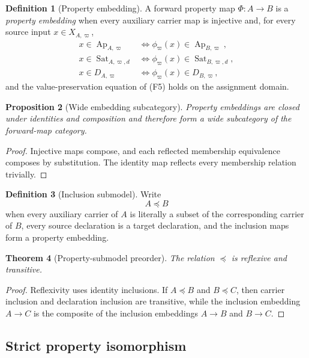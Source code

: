 \documentclass[11pt]{article}
\newcommand{\Ap}{\operatorname{Ap}}
\newcommand{\Sat}{\operatorname{Sat}}
\newtheorem{theorem}{Theorem}[section]
\newtheorem{proposition}[theorem]{Proposition}
\theoremstyle{definition}
\newtheorem{definition}[theorem]{Definition}
\theoremstyle{remark}
\begin{document}
\begin{definition}[Property embedding]
A forward property map \(\Phi:A\to B\) is a \emph{property embedding} when every auxiliary carrier map is injective and, for every source input \(x\in X_{A,\varpi}\),
\[
\begin{aligned}
x\in\Ap_{A,\varpi}
&\Longleftrightarrow
\phi_{\varpi}(x)\in\Ap_{B,\varpi},\\
x\in\Sat_{A,\varpi,d}
&\Longleftrightarrow
\phi_{\varpi}(x)\in\Sat_{B,\varpi,d},\\
x\in D_{A,\varpi}
&\Longleftrightarrow
\phi_{\varpi}(x)\in D_{B,\varpi},
\end{aligned}
\]
and the value-preservation equation of (F5) holds on the assignment domain.
\end{definition}

\begin{proposition}[Wide embedding subcategory]
Property embeddings are closed under identities and composition and therefore form a wide subcategory of the forward-map category.
\end{proposition}

\begin{proof}
Injective maps compose, and each reflected membership equivalence composes by substitution.
The identity map reflects every membership relation trivially.
\end{proof}

\begin{definition}[Inclusion submodel]
Write
\[
A\preccurlyeq B
\]
when every auxiliary carrier of \(A\) is literally a subset of the corresponding carrier of \(B\), every source declaration is a target declaration, and the inclusion maps form a property embedding.
\end{definition}

\begin{theorem}[Property-submodel preorder]
The relation \(\preccurlyeq\) is reflexive and transitive.
\end{theorem}

\begin{proof}
Reflexivity uses identity inclusions.
If \(A\preccurlyeq B\) and \(B\preccurlyeq C\), then carrier inclusion and declaration inclusion are transitive, while the inclusion embedding \(A\to C\) is the composite of the inclusion embeddings \(A\to B\) and \(B\to C\).
\end{proof}

\subsection{Strict property isomorphism}
\end{document}
